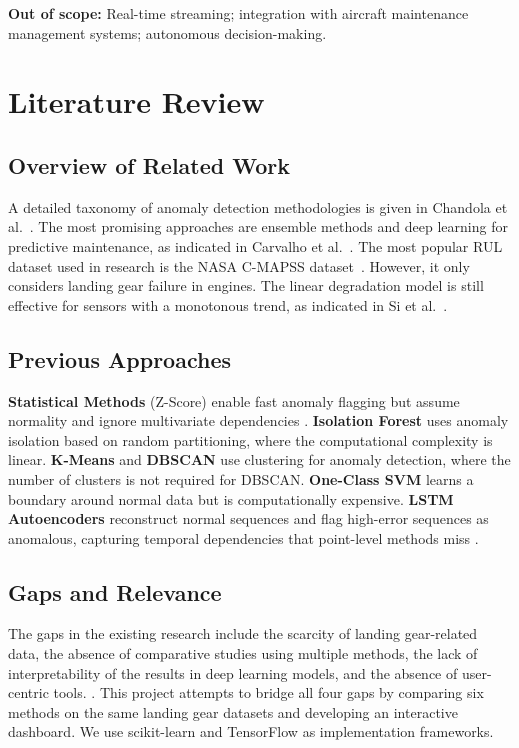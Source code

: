 \documentclass{CLS_zhou430}
\begin{document}
\textbf{Out of scope:} Real-time streaming; integration with aircraft maintenance management systems; autonomous decision-making.


\chapter{Literature Review}

\section{Overview of Related Work}
A detailed taxonomy of anomaly detection methodologies is given in Chandola et al.\ \cite{chandola2009anomaly}. The most promising approaches are ensemble methods and deep learning for predictive maintenance, as indicated in Carvalho et al.\ \cite{carvalho2019systematic}. The most popular RUL dataset used in research is the NASA C-MAPSS dataset\ \cite{saxena2008damage}. However, it only considers landing gear failure in engines. The linear degradation model is still effective for sensors with a monotonous trend, as indicated in Si et al.\ \cite{si2011remaining}.

\section{Previous Approaches}
\textbf{Statistical Methods} (Z-Score) enable fast anomaly flagging but assume normality and ignore multivariate dependencies \cite{chandola2009anomaly}. \textbf{Isolation Forest} \cite{liu2008isolation} uses anomaly isolation based on random partitioning, where the computational complexity is linear. \textbf{K-Means} and \textbf{DBSCAN} \cite{ester1996density} use clustering for anomaly detection, where the number of clusters is not required for DBSCAN. \textbf{One-Class SVM} \cite{scholkopf2001estimating} learns a boundary around normal data but is computationally expensive. \textbf{LSTM Autoencoders} \cite{malhotra2016lstm} reconstruct normal sequences and flag high-error sequences as anomalous, capturing temporal dependencies that point-level methods miss \cite{hochreiter1997long}.

\section{Gaps and Relevance}
The gaps in the existing research include the scarcity of landing gear-related data, the absence of comparative studies using multiple methods, the lack of interpretability of the results in deep learning models, and the absence of user-centric tools. \cite{uwe2023landing}. This project attempts to bridge all four gaps by comparing six methods on the same landing gear datasets and developing an interactive dashboard. We use scikit-learn \cite{pedregosa2011scikit} and TensorFlow \cite{tensorflow2015} as implementation frameworks.
\end{document}
